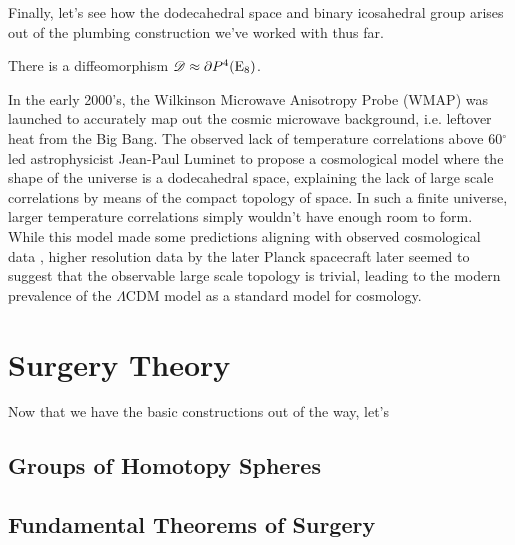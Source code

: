 Finally, let's see how the dodecahedral space and binary icosahedral group arises out of the plumbing construction we've worked with thus far.


\begin{proposition}
	There is a diffeomorphism $\mathscr{D}\approx \partial P^4({\operatorname{E}}_8)$.
\end{proposition}


\begin{remark}
	In the early 2000's, the Wilkinson Microwave Anisotropy Probe (WMAP) was launched to accurately map out the cosmic microwave background, i.e. leftover heat from the Big Bang. The observed lack of temperature correlations above 60$^\circ$ led astrophysicist Jean-Paul Luminet to propose a cosmological model \cite{luminet2003dodecahedral} where the shape of the universe is a dodecahedral space, explaining the lack of large scale correlations by means of the compact topology of space. In such a finite universe, larger temperature correlations simply wouldn't have enough room to form.
	While this model made some predictions aligning with observed cosmological data
	\cite{roukema2008dodecahedral}, higher resolution data by the later Planck spacecraft later seemed to suggest that the observable large scale topology is trivial, leading to the modern prevalence of the $\Lambda$CDM model as a standard model for cosmology.
\end{remark}

\section{Surgery Theory}

Now that we have the basic constructions out of the way, let's 

\subsection{Groups of Homotopy Spheres}

\begin{definition}
\end{definition}

\subsection{Fundamental Theorems of Surgery}

